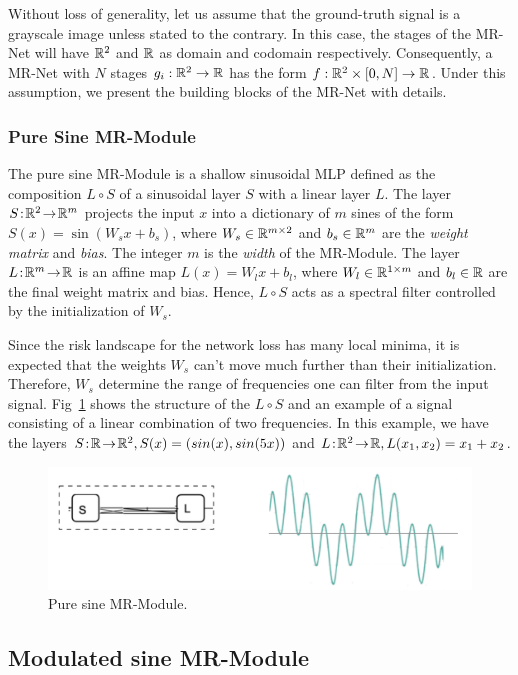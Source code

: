 Without loss of generality, let us assume that the ground-truth signal is a grayscale image unless stated to the contrary. In this case, the stages of the MR-Net will have $\mathbb{R}^2$ and $\mathbb{R}$ as domain and codomain respectively. 
Consequently, a MR-Net with $N$ stages $g_i:\mathbb{R}^2\to \mathbb{R}$ has the form $f:\mathbb{R}^2\times [0,N]\to \mathbb{R}$.
Under this assumption, we present the building blocks of the MR-Net with details. 


\subsubsection{Pure Sine MR-Module}

The pure sine MR-Module is a shallow sinusoidal MLP defined as the composition $L\circ S$ of a sinusoidal layer $S$ with a linear layer $L$.
The layer $S\!:\!\mathbb{R}^2\!\to\! \mathbb{R}^m$ projects the input $x$ into a dictionary of $m$ sines of the form $S(x)=\sin\left(W_s x+ b_s\right)$, where $W_s\in \mathbb{R}^{m\times 2}$ and $b_s\in \mathbb{R}^{m}$ are the \textit{weight matrix} and \textit{bias}. The integer $m$ is the \textit{width} of the MR-Module.
The layer $L\!:\!\mathbb{R}^m\!\to\! \mathbb{R}$ is an affine map $L(x)=W_lx+b_l$, where $W_l\in \mathbb{R}^{1\times m} $ and $b_l\in \mathbb{R}$  are the final weight matrix and bias.
Hence, $L\circ S$ acts as a spectral filter controlled by the initialization of $W_s$.


Since the risk landscape for the network loss has many local minima, it is expected that the weights $W_s$ can’t move much further than their initialization. Therefore, $W_s$ determine the range of frequencies one can filter from the input signal. Fig~\ref{f:pure-sine} shows the structure of the $L\circ S$ and an example of a signal consisting of a linear combination of two frequencies. In this example, we have the layers $S\!:\!\mathbb{R}\!\to\! \mathbb{R}^2, S(x) = (sin(x), sin(5x))$ and $L\!:\!\mathbb{R}^2\!\to\! \mathbb{R}, L(x_1, x_2) = x_1 + x_2$.

\begin{figure}[!h]
\centering
\includegraphics[width=0.8\linewidth]{img/ch4/pure-sine.png}
\caption{Pure sine MR-Module.}
\label{f:pure-sine}
\end{figure}


\subsection{Modulated sine MR-Module}

